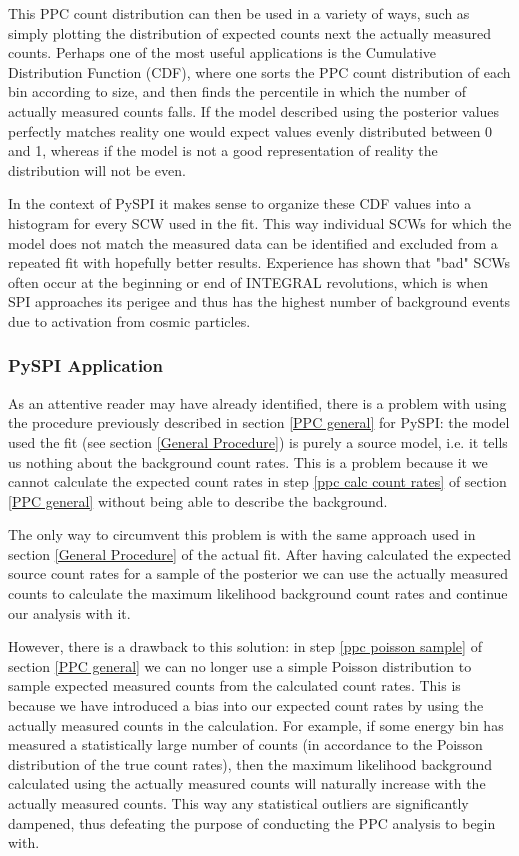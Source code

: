 \documentclass{report}
\begin{document}
This PPC count distribution can then be used in a variety of ways, such as simply plotting the distribution of expected counts next the actually measured counts. Perhaps one of the most useful applications is the Cumulative Distribution Function (CDF), where one sorts the PPC count distribution of each bin according to size, and then finds the percentile in which the number of actually measured counts falls. If the model described using the posterior values perfectly matches reality one would expect values evenly distributed between 0 and 1, whereas if the model is not a good representation of reality the distribution will not be even. 

In the context of PySPI it makes sense to organize these CDF values into a histogram for every SCW used in the fit. This way individual SCWs for which the model does not match the measured data can be identified and excluded from a repeated fit with hopefully better results. Experience has shown that "bad" SCWs often occur at the beginning or end of INTEGRAL revolutions, which is when SPI approaches its perigee and thus has the highest number of background events due to activation from cosmic particles. 

\subsubsection{PySPI Application}
As an attentive reader may have already identified, there is a problem with using the procedure previously described in section \ref{PPC general} for PySPI: the model used the fit (see section \ref{General Procedure}) is purely a source model, i.e. it tells us nothing about the background count rates. This is a problem because it we cannot calculate the expected count rates in step \ref{ppc calc count rates} of section \ref{PPC general} without being able to describe the background.

The only way to circumvent this problem is with the same approach used in section \ref{General Procedure} of the actual fit. After having calculated the expected source count rates for a sample of the posterior we can use the actually measured counts to calculate the maximum likelihood background count rates and continue our analysis with it.

However, there is a drawback to this solution: in step \ref{ppc poisson sample} of section \ref{PPC general} we can no longer use a simple Poisson distribution to sample expected measured counts from the calculated count rates. This is because we have introduced a bias into our expected count rates by using the actually measured counts in the calculation. For example, if some energy bin has measured a statistically large number of counts (in accordance to the Poisson distribution of the true count rates), then the maximum likelihood background calculated using the actually measured counts will naturally increase with the actually measured counts. This way any statistical outliers are significantly dampened, thus defeating the purpose of conducting the PPC analysis to begin with.
\end{document}

